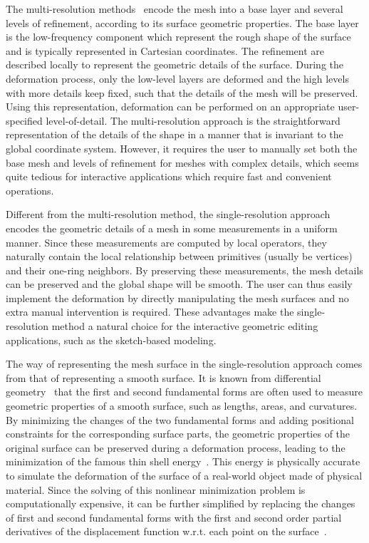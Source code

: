 The multi-resolution
methods~\cite{ZSS97,GSS99,KCVS98,KVS99,SL99,BK04,MS11} encode the
mesh into a base layer and several levels of refinement, according
to its surface geometric properties. The base layer is the
low-frequency component which represent the rough shape of the
surface and is typically represented in Cartesian coordinates. The
refinement are described locally to represent the geometric details
of the surface. During the deformation process, only the low-level
layers are deformed and the high levels with more details keep
fixed, such that the details of the mesh will be preserved. Using
this representation, deformation can be performed on an appropriate
user-specified level-of-detail. The multi-resolution approach is the
straightforward representation of the details of the shape in a
manner that is invariant to the global coordinate system. However,
it requires the user to manually set both the base mesh and levels
of refinement for meshes with complex details, which seems quite
tedious for interactive applications which require fast and
convenient operations.

Different  from the multi-resolution method, the single-resolution
approach encodes the geometric details of a mesh in some
measurements in a uniform manner. Since these measurements are
computed by local operators, they naturally contain the local
relationship between primitives (usually be vertices) and their
one-ring neighbors. By preserving these measurements, the mesh
details can be preserved and the global shape will be smooth. The
user can thus easily implement the deformation by directly
manipulating the mesh surfaces and no extra manual intervention is
required. These advantages make the single-resolution method a
natural choice for the interactive geometric editing applications,
such as the sketch-based modeling.

The way of  representing the mesh surface in the single-resolution
approach comes from that of representing a smooth surface. It is
known from differential geometry~\cite{MPDC76} that the first and
second fundamental forms are often used to measure geometric
properties of a smooth surface, such as lengths, areas, and
curvatures. By minimizing the changes of the two fundamental forms
and adding positional constraints for the corresponding surface
parts, the geometric properties of the original surface can be
preserved during a deformation process, leading to the minimization
of the famous thin shell energy~\cite{TPBF87}. This energy is
physically accurate to simulate the deformation of the surface of a
real-world object made of physical material. Since the solving of
this nonlinear minimization problem is computationally expensive, it
can be further simplified by replacing the changes of first and
second fundamental forms with the first and second order partial
derivatives of the displacement function w.r.t. each point on the
surface~\cite{CG91,WW92}.

